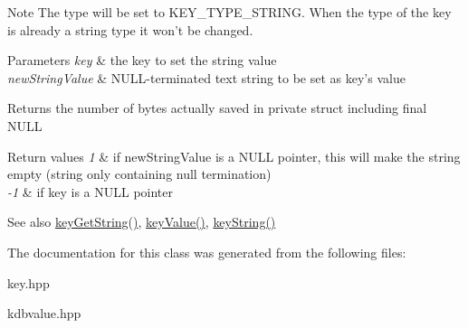 \begin{DoxyNote}{Note}
The type will be set to K\+E\+Y\+\_\+\+T\+Y\+P\+E\+\_\+\+S\+T\+R\+I\+N\+G. When the type of the key is already a string type it won't be changed.
\end{DoxyNote}

\begin{DoxyParams}{Parameters}
{\em key} & the key to set the string value \\
\hline
{\em new\+String\+Value} & N\+U\+L\+L-\/terminated text string to be set as {\ttfamily key's} value \\
\hline
\end{DoxyParams}
\begin{DoxyReturn}{Returns}
the number of bytes actually saved in private struct including final N\+U\+L\+L 
\end{DoxyReturn}

\begin{DoxyRetVals}{Return values}
{\em 1} & if new\+String\+Value is a N\+U\+L\+L pointer, this will make the string empty (string only containing null termination) \\
\hline
{\em -\/1} & if key is a N\+U\+L\+L pointer \\
\hline
\end{DoxyRetVals}
\begin{DoxySeeAlso}{See also}
\hyperlink{group__keyvalue_ga41b9fac5ccddafe407fc0ae1e2eb8778}{key\+Get\+String()}, \hyperlink{group__keyvalue_ga6f29609c5da53c6dc26a98678d5752af}{key\+Value()}, \hyperlink{group__keyvalue_ga880936f2481d28e6e2acbe7486a21d05}{key\+String()} 
\end{DoxySeeAlso}


The documentation for this class was generated from the following files\+:\begin{DoxyCompactItemize}
\item 
key.\+hpp\item 
kdbvalue.\+hpp\end{DoxyCompactItemize}
